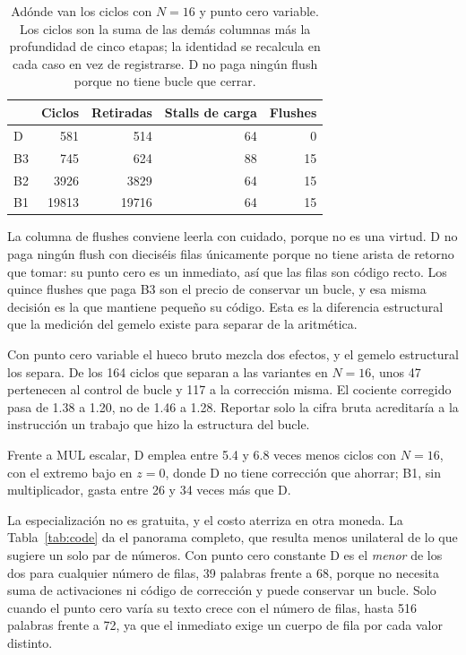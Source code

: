 \begin{table}[!htbp]
\caption{Adónde van los ciclos con \(N{=}16\) y punto cero variable. Los ciclos
son la suma de las demás columnas más la profundidad de cinco etapas; la
identidad se recalcula en cada caso en vez de registrarse. D no paga ningún
flush porque no tiene bucle que cerrar.}
\label{tab:breakdown}
\centering
\begin{tabular}{lrrrr}
\hline
 & Ciclos & Retiradas & Stalls de carga & Flushes \\
\hline
D & 581 & 514 & 64 & 0 \\
B3 & 745 & 624 & 88 & 15 \\
B2 & 3926 & 3829 & 64 & 15 \\
B1 & 19813 & 19716 & 64 & 15 \\
\hline
\end{tabular}
\end{table}

La columna de flushes conviene leerla con cuidado, porque no es una virtud. D no paga
ningún flush con dieciséis filas únicamente porque no tiene arista de retorno que
tomar: su punto cero es un inmediato, así que las filas son código recto. Los
quince flushes que paga B3 son el precio de conservar un bucle, y esa misma
decisión es la que mantiene pequeño su código. Esta es la diferencia estructural
que la medición del gemelo existe para separar de la aritmética.

Con punto cero variable el hueco bruto mezcla dos efectos, y el gemelo
estructural los separa. De los 164 ciclos que separan a las variantes en
\(N{=}16\), unos 47 pertenecen al control de bucle y 117 a la corrección misma.
El cociente corregido pasa de 1.38 a 1.20, no de 1.46 a 1.28. Reportar solo la
cifra bruta acreditaría a la instrucción un trabajo que hizo la estructura del
bucle.

Frente a MUL escalar, D emplea entre 5.4 y 6.8 veces menos ciclos con
\(N{=}16\), con el extremo bajo en \(z{=}0\), donde D no tiene corrección que
ahorrar; B1, sin multiplicador, gasta entre 26 y 34 veces más que D.

La especialización no es gratuita, y el costo aterriza en otra moneda. La
Tabla~\ref{tab:code} da el panorama completo, que resulta menos unilateral de lo
que sugiere un solo par de números. Con punto cero constante D es el
\emph{menor} de los dos para cualquier número de filas, 39 palabras frente a 68,
porque no necesita suma de activaciones ni código de corrección y puede
conservar un bucle. Solo cuando el punto cero varía su texto crece con el número
de filas, hasta 516 palabras frente a 72, ya que el inmediato exige un cuerpo de
fila por cada valor distinto.

